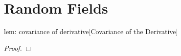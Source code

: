 \section{Random Fields}

\begin{replemma}{lem: covariance of derivative}[Covariance of the Derivative]
	
\end{replemma}
\begin{proof}
	
\end{proof}